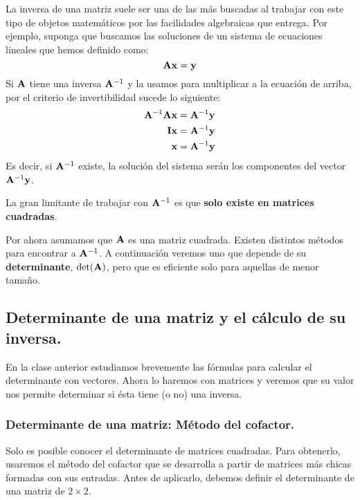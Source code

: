 \documentclass[12pt]{article}
\begin{document}
La inversa de una matriz suele ser una de las más buscadas al trabajar con este tipo de objetos matemáticos por las facilidades algebraicas que entrega. Por ejemplo, suponga que buscamos las soluciones de un sistema de ecuaciones lineales que hemos definido como:
\[
  \mathbf{A} \mathbf{x} = \mathbf{y}
\]
Si $\mathbf{A}$ tiene una inversa $\mathbf{A}^{-1}$ y la usamos para multiplicar a la ecuación de arriba, por el criterio de invertibilidad sucede lo siguiente:
\begin{align*}
  \mathbf{A}^{-1} \mathbf{A} \mathbf{x} &= \mathbf{A}^{-1} \mathbf{y} \\
  \mathbf{I} \mathbf{x} &= \mathbf{A}^{-1} \mathbf{y} \\
  \mathbf{x} &= \mathbf{A}^{-1} \mathbf{y}
\end{align*}
Es decir, si $\mathbf{A}^{-1}$ existe, la solución del sistema serán los componentes del vector $\mathbf{A}^{-1}\mathbf{y}$.

La gran limitante de trabajar con $\mathbf{A}^{-1}$ es que \textbf{solo existe en matrices cuadradas}.

Por ahora asumamos que $\mathbf{A}$ es una matriz cuadrada. Existen distintos métodos para encontrar a $\mathbf{A}^{-1}$. A continuación veremos uno que depende de su \textbf{determinante}, $\det(\mathbf{A})$, pero que es eficiente solo para aquellas de menor tamaño.

\subsection{Determinante de una matriz y el cálculo de su inversa.}

En la clase anterior estudiamos brevemente las fórmulas para calcular el determinante con vectores. Ahora lo haremos con matrices y veremos que su valor nos permite determinar si ésta tiene (o no) una inversa.

\subsubsection{Determinante de una matriz: Método del cofactor.}

Solo es posible conocer el determinante de matrices cuadradas. Para obtenerlo, usaremos el método del cofactor que se desarrolla a partir de matrices más chicas formadas con sus entradas. Antes de aplicarlo, debemos definir el determinante de una matriz de $2 \times 2$.
\end{document}
